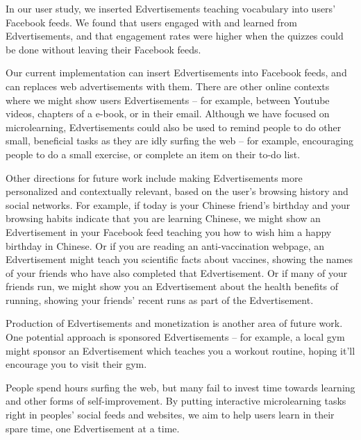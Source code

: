\documentclass{sigchi}
\begin{document}
In our user study, we inserted Edvertisements teaching vocabulary into users' Facebook feeds. We found that users engaged with and learned from Edvertisements, and that engagement rates were higher when the quizzes could be done without leaving their Facebook feeds.

Our current implementation can insert Edvertisements into Facebook feeds, and can replaces web advertisements with them. There are other online contexts where we might show users Edvertisements -- for example, between Youtube videos, chapters of a e-book, or in their email. Although we have focused on microlearning, Edvertisements could also be used to remind people to do other small, beneficial tasks as they are idly surfing the web -- for example, encouraging people to  do a small exercise, or complete an item on their to-do list. %

Other directions for future work include making Edvertisements more personalized and contextually relevant, based on the user's browsing history and social networks. For example, if today is your Chinese friend's birthday and your browsing habits indicate that you are learning Chinese, we might show an Edvertisement in your Facebook feed teaching you how to wish him a happy birthday in Chinese. Or if you are reading an anti-vaccination webpage, an Edvertisement might teach you scientific facts about vaccines, showing the names of your friends who have also completed that Edvertisement. Or if many of your friends run, we might show you an Edvertisement about the health benefits of running, showing your friends' recent runs as part of the Edvertisement. %

Production of Edvertisements and monetization is another area of future work. One potential approach is sponsored Edvertisements -- for example, a local gym might sponsor an Edvertisement which teaches you a workout routine, hoping it'll encourage you to visit their gym.


People spend hours surfing the web, but many fail to invest time towards learning and other forms of self-improvement. By putting interactive microlearning tasks right in peoples' social feeds and websites, we aim to help users learn in their spare time, one Edvertisement at a time. %
\end{document}
